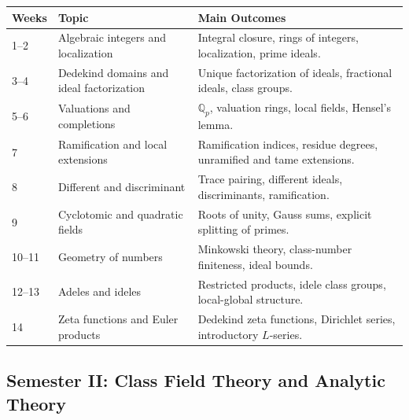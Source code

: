 \documentclass[11pt]{article}
\newcommand{\Q}{\mathbb{Q}}
\begin{document}
\begin{longtable}{p{}p{}p{}}
\toprule
\textbf{Weeks} & \textbf{Topic} & \textbf{Main Outcomes} \\
\midrule
\endhead

1--2 &
Algebraic integers and localization &
Integral closure, rings of integers, localization, prime ideals. \\

3--4 &
Dedekind domains and ideal factorization &
Unique factorization of ideals, fractional ideals, class groups. \\

5--6 &
Valuations and completions &
$\Q_p$, valuation rings, local fields, Hensel's lemma. \\

7 &
Ramification and local extensions &
Ramification indices, residue degrees, unramified and tame extensions. \\

8 &
Different and discriminant &
Trace pairing, different ideals, discriminants, ramification. \\

9 &
Cyclotomic and quadratic fields &
Roots of unity, Gauss sums, explicit splitting of primes. \\

10--11 &
Geometry of numbers &
Minkowski theory, class-number finiteness, ideal bounds. \\

12--13 &
Adeles and ideles &
Restricted products, idele class groups, local-global structure. \\

14 &
Zeta functions and Euler products &
Dedekind zeta functions, Dirichlet series, introductory $L$-series. \\
\bottomrule
\end{longtable}

\subsection*{Semester II: Class Field Theory and Analytic Theory}
\end{document}
